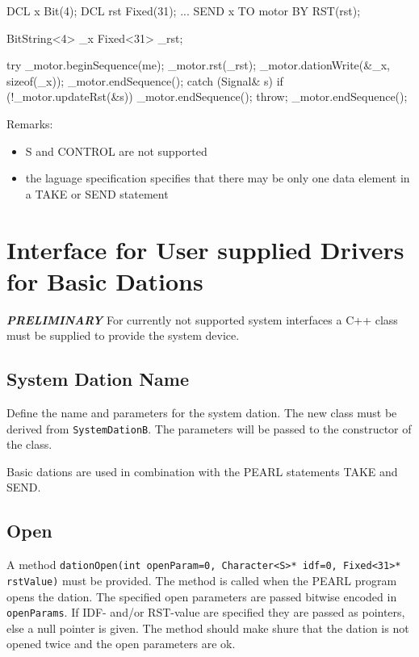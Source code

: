 \begin{PEARLCode}
DCL x Bit(4);
DCL rst Fixed(31);
...
SEND x TO motor BY RST(rst);
\end{PEARLCode}

\begin{CppCode}
BitString<4> _x
Fixed<31> _rst;

try {
   _motor.beginSequence(me);
   _motor.rst(_rst);
   _motor.dationWrite(&_x, sizeof(_x));
   _motor.endSequence();
} catch (Signal& s) {
   if (!_motor.updateRst(&s)) {
      _motor.endSequence();
      throw;
   }
   _motor.endSequence();
}
\end{CppCode}


Remarks:
\begin{itemize}
\item S and CONTROL are not supported
\item the laguage specification specifies that there
   may be only one data element in a TAKE or SEND statement
\end{itemize}

\section{Interface for User supplied Drivers for Basic Dations}
{\bf \it PRELIMINARY} For currently not supported system interfaces a C++ class must be supplied to 
provide the system device.

\subsection{System Dation Name}
Define the name and parameters for the system dation.
The new class must be derived from \verb|SystemDationB|.
The parameters will be passed to the constructor of the class.

Basic dations are used in combination with the PEARL statements TAKE and
SEND.

\subsection{Open}
A method \verb|dationOpen(int openParam=0, Character<S>* idf=0, Fixed<31>* rstValue)|
must be provided.
The method is called when the PEARL program opens the dation.
The specified open parameters are passed bitwise encoded in \verb|openParams|.
If IDF- and/or RST-value are specified they are passed as pointers, else
a null pointer is given.
The method should make shure that the dation is not opened twice and
the open parameters are ok.

